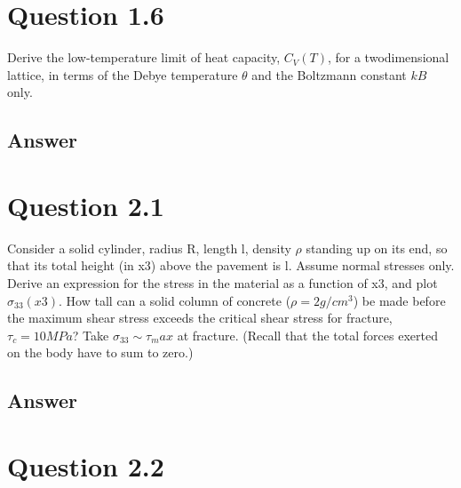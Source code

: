 \documentclass[
	12pt, %
]{fphw}
\begin{document}
\section*{Question 1.6}

\begin{problem}
Derive the low-temperature limit of heat capacity, $C_V (T)$, for a twodimensional lattice, in terms of the Debye temperature $\theta$ and the Boltzmann constant $kB$ only.
\end{problem}


\subsection*{Answer}




\section*{Question 2.1}

\begin{problem}
Consider a solid cylinder, radius R, length l, density $\rho$ standing up
on its end, so that its total height (in x3) above the pavement is l.
Assume normal stresses only. Derive an expression for the stress in
the material as a function of x3, and plot $\sigma_{33}(x3)$. How tall can a solid
column of concrete ($\rho = 2 g/cm^3
$) be made before the maximum shear
stress exceeds the critical shear stress for fracture, $\tau_c = 10 MPa$? Take
$\sigma_{33} \sim \tau_max$ at fracture. (Recall that the total forces exerted on the
body have to sum to zero.)
\end{problem}


\subsection*{Answer}




\section*{Question 2.2}
\end{document}
